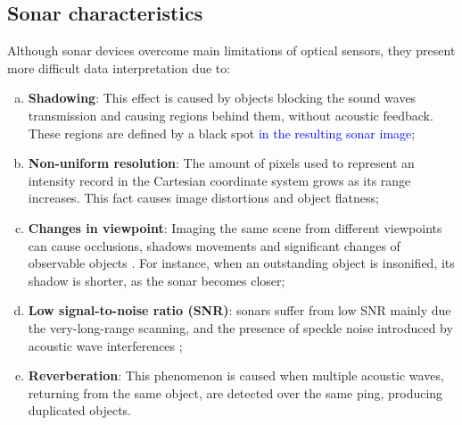 \documentclass[final,5p,times]{elsarticle}
\begin{document}

\subsection{Sonar characteristics}
\label{sonar:characteristics}

Although sonar devices overcome main limitations of optical sensors, they
present more difficult data interpretation due to:

\begin{enumerate}[a)]
    \item \textbf{Shadowing}: This effect is caused by objects blocking the
sound waves transmission and causing regions behind them, without acoustic feedback. These regions are defined by a black spot \textcolor{blue}{in the resulting sonar image};
    \item \textbf{Non-uniform resolution}: The amount of pixels used to represent an intensity record in the Cartesian coordinate system grows as    its range increases. This fact causes image distortions and object flatness;
    \item \textbf{Changes in viewpoint}: Imaging the same scene from different viewpoints can cause occlusions, shadows movements and significant  changes of observable objects \cite{hurtos2014}. For instance, when an    outstanding object is insonified, its shadow is shorter, as the sonar becomes closer;
    \item \textbf{Low signal-to-noise ratio (SNR)}: sonars suffer from low SNR mainly due the very-long-range scanning, and the presence of speckle noise introduced by acoustic wave interferences \cite{abbott1979};
    \item \textbf{Reverberation}: This phenomenon is caused when multiple acoustic waves, returning from the same object, are detected over the same ping, producing duplicated objects.
\end{enumerate}
\end{document}
